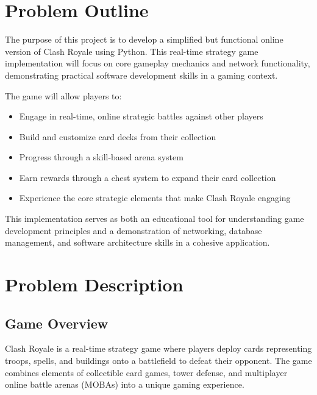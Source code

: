 \documentclass{article}
\begin{document}
\begin{ganttchart}
\end{ganttchart}

\section{Problem Outline}

The purpose of this project is to develop a simplified but functional online version of Clash Royale using Python. This real-time strategy game implementation will focus on core gameplay mechanics and network functionality, demonstrating practical software development skills in a gaming context.

\noindent The game will allow players to:
\begin{itemize}
    \item Engage in real-time, online strategic battles against other players
    \item Build and customize card decks from their collection
    \item Progress through a skill-based arena system
    \item Earn rewards through a chest system to expand their card collection
    \item Experience the core strategic elements that make Clash Royale engaging
\end{itemize}

\noindent This implementation serves as both an educational tool for understanding game development principles and a demonstration of networking, database management, and software architecture skills in a cohesive application.

\section{Problem Description}

\subsection{Game Overview}
Clash Royale is a real-time strategy game where players deploy cards representing troops, spells, and buildings onto a battlefield to defeat their opponent. The game combines elements of collectible card games, tower defense, and multiplayer online battle arenas (MOBAs) into a unique gaming experience.
\end{document}
